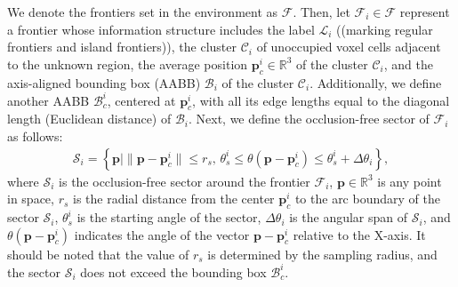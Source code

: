 \documentclass[letterpaper, 10pt, journal, twoside]{support/IEEEtran}
\begin{document}
We denote the frontiers set in the environment as \( \boldsymbol{\mathcal{F}}\). Then, let $\mathcal{F}_i \in \boldsymbol{\mathcal{F}}$ represent a frontier whose information structure includes the label $\mathcal{L}_i$ ((marking regular frontiers and island frontiers)), the cluster $\mathcal{C}_i$ of unoccupied voxel cells adjacent to the unknown region, the average position $\mathbf{p}_c^i \in \mathbb{R}^3$ of the cluster $\mathcal{C}_i$, and the axis-aligned bounding box (AABB) $\mathcal{B}_i$ of the cluster $\mathcal{C}_i$. Additionally, we define another AABB $\mathcal{B}_c^i$, centered at $\mathbf{p}_c^i$, with all its edge lengths equal to the diagonal length (Euclidean distance) of $\mathcal{B}_i$. 
Next, we define the occlusion-free sector of $\mathcal{F}_i$ as follows:
\begin{equation}
  \label{Equation1}
  \begin{aligned}
    \mathcal{S}_i = \left\{ \mathbf{p} \mid \| \mathbf{p} - \mathbf{p}_c^i \| \leq r_s, \, \theta_s^i \leq \theta(\mathbf{p} - \mathbf{p}_c^i) \leq \theta_s^i+\Delta\theta_i \right\},
  \end{aligned}
\end{equation}
where \( \mathcal{S}_i \) is the occlusion-free sector around the frontier \( \mathcal{F}_i \), \( \mathbf{p} \in \mathbb{R}^3\) is any point in space, \( r_s \) is the radial distance from the center $\mathbf{p}_c^i$ to the arc boundary of the sector \( \mathcal{S}_i \), \( \theta_s^i \) is the starting angle of the sector, \( \Delta\theta_i \) is the angular span of \( \mathcal{S}_i \), and \( \theta(\mathbf{p} - \mathbf{p}_c^i) \) indicates the angle of the vector $\mathbf{p} - \mathbf{p}_c^i$ relative to the X-axis. It should be noted that the value of \(r_s\) is determined by the sampling radius, and the sector \( \mathcal{S}_i \) does not exceed the bounding box \(\mathcal{B}_c^i\).
\end{document}
